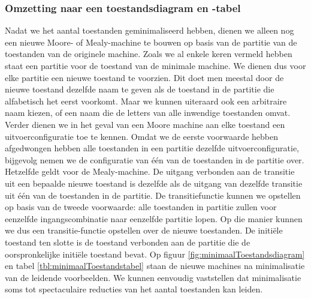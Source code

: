 \subsubsection{Omzetting naar een toestandsdiagram en -tabel}
Nadat we het aantal toestanden geminimaliseerd hebben, dienen we alleen nog een nieuwe Moore- of Mealy-machine te bouwen op basis van de partitie van de toestanden van de originele machine. Zoals we al enkele keren vermeld hebben staat een partitie voor de toestand van de minimale machine. We dienen dus voor elke partitie een nieuwe toestand te voorzien. Dit doet men meestal door de nieuwe toestand dezelfde naam te geven als de toestand in de partitie die alfabetisch het eerst voorkomt. Maar we kunnen uiteraard ook een arbitraire naam kiezen, of een naam die de letters van alle inwendige toestanden omvat. Verder dienen we in het geval van een Moore machine aan elke toestand een uitvoerconfiguratie toe te kennen. Omdat we de eerste voorwaarde hebben afgedwongen hebben alle toestanden in een partitie dezelfde uitvoerconfiguratie, bijgevolg nemen we de configuratie van \'e\'en van de toestanden in de partitie over. Hetzelfde geldt voor de Mealy-machine. De uitgang verbonden aan de transitie uit een bepaalde nieuwe toestand is dezelfde als de uitgang van dezelfde transitie uit \'e\'en van de toestanden in de partitie. De transitiefunctie kunnen we opstellen op basis van de tweede voorwaarde: alle toestanden in partitie zullen voor eenzelfde ingangscombinatie naar eenzelfde partitie lopen. Op die manier kunnen we dus een transitie-functie opstellen over de nieuwe toestanden. De initi\"ele toestand ten slotte is de toestand verbonden aan de partitie die de oorspronkelijke initi\"ele toestand bevat. Op figuur \ref{fig:minimaalToestandsdiagram} en tabel \ref{tbl:minimaalToestandstabel} staan de nieuwe machines na minimalisatie van de leidende voorbeelden. We kunnen eenvoudig vaststellen dat minimalisatie soms tot spectaculaire reducties van het aantal toestanden kan leiden.
